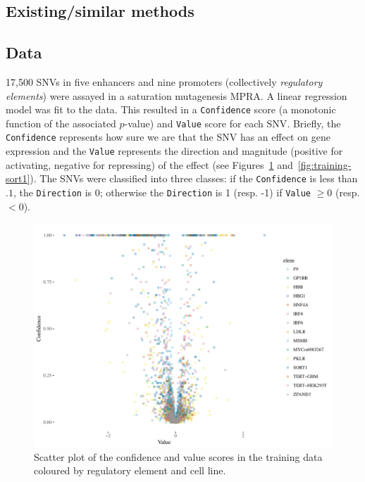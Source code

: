 \documentclass{article}
\begin{document}
\subsection*{Existing/similar methods}


\subsection*{Data}

17,500 \acp{SNV} in five enhancers and nine promoters (collectively \emph{regulatory
elements}) were assayed in a saturation mutagenesis \ac{MPRA}. A linear
regression model was fit to the data. This resulted in a \texttt{Confidence}
score (a monotonic function of the associated $p$-value) and \texttt{Value}
score for each \ac{SNV}\@. Briefly, the \texttt{Confidence} represents how sure we
are that the \ac{SNV} has an effect on gene expression and the \texttt{Value}
represents the direction and magnitude (positive for activating, negative for
repressing) of the effect (see Figures~\ref{fig:conf-value}
and~\ref{fig:training-sort1}). The SNVs were classified into three classes: if
the \texttt{Confidence} is less than $.1$, the \texttt{Direction} is 0;
otherwise the \texttt{Direction} is 1 (resp. -1) if \texttt{Value} $\ge 0$
(resp. $< 0$).

\begin{figure}[ht]
\includegraphics[width=\textwidth]{fig-conf-value-scatter}
\caption{Scatter plot of the confidence and value scores in the training data coloured
by regulatory element and cell line.}
\label{fig:conf-value}
\end{figure}
\end{document}
